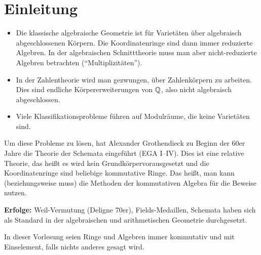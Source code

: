 \chapter{Einleitung}
\begin{itemize}
	\item Die klassische algebraische Geometrie ist für Varietäten über algebraisch abgeschlossenen Körpern. Die Koordinatenringe sind dann immer reduzierte Algebren. In der algebraischen Schnitttheorie muss man aber nicht-reduzierte Algebren betrachten (\enquote{Multiplizitäten}).
	\item In der Zahlentheorie wird man gezwungen, über Zahlenkörpern zu arbeiten. Dies sind endliche Körpererweiterungen von $\mathbb {Q}$, also nicht algebraisch abgeschlossen.
	\item Viele Klassifikationsprobleme führen auf Modulräume, die keine Varietäten sind.
\end{itemize}
Um diese Probleme zu lösen, hat Alexander Grothendieck zu Beginn der 60er Jahre die Theorie der Schemata eingeführt (EGA I--IV). Dies ist eine relative Theorie, das heißt es wird kein Grundkörpervorausgesetzt und die Koordinatenringe sind beliebige kommutative Ringe. Das heißt, man kann (beziehungsweise muss) die Methoden der kommutativen Algebra für die Beweise nutzen.

\textbf{Erfolge:} Weil-Vermutung (Deligne 70er), Fields-Medaillen, Schemata haben sich als Standard in der algebraischen und arithmetischen Geometrie durchgesetzt.

In dieser Vorlesung seien Ringe und Algebren immer kommutativ und mit Einselement, falls nichts anderes gesagt wird.
